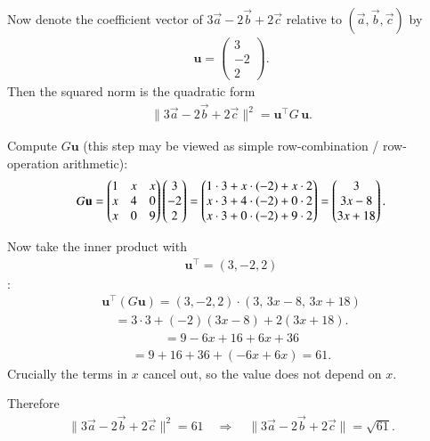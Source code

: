 \documentclass[journal]{IEEEtran}
\begin{document}
Now denote the coefficient vector of $3\vec a-2\vec b+2\vec c$ relative to $(\vec a,\vec b,\vec c)$ by
\begin{align}
\mathbf{u}=\begin{pmatrix}3\\-2\\2\end{pmatrix}.
\end{align}
Then the squared norm is the quadratic form
\begin{align}
\bigl\lVert 3\vec a-2\vec b+2\vec c\bigr\rVert^2
= \mathbf{u}^\top G\,\mathbf{u}.
\end{align}

Compute $G\mathbf{u}$ (this step may be viewed as simple row-combination / row-operation arithmetic):
\begin{align}
G\mathbf{u}
=\begin{pmatrix}1 & x & x\\
x & 4 & 0\\
x & 0 & 9\end{pmatrix}
\begin{pmatrix}3\\-2\\2 \end{pmatrix}
=
\begin{pmatrix}1\cdot 3 + x\cdot(-2)+x\cdot 2\\
x\cdot 3 + 4\cdot(-2) +0\cdot 2\\
x\cdot 3 +0\cdot(-2)+9\cdot 2\end{pmatrix}
=
\begin{pmatrix}3\\3x-8\\3x+18\end{pmatrix} .
\end{align}

Now take the inner product with 
\begin{align}
\mathbf{u}^\top=(3,-2,2)
\end{align} :
\begin{align}
\mathbf{u}^\top (G\mathbf{u})
= (3,-2,2)\cdot (3,\,3x-8,\,3x+18)
\end{align}
\begin{align}
=3\cdot 3 + (-2)(3x-8) + 2(3x+18).
\end{align}
\begin{align}
=9 -6x +16 +6x +36 
\end{align}
\begin{align}
= 9+16+36 +(-6x+6x)=61.
\end{align}
Crucially the terms in $x$ cancel out, so the value does not depend on $x$.

Therefore
\begin{align}
\bigl\lVert 3\vec a-2\vec b+2\vec c\bigr\rVert^2 = 61
\quad\Longrightarrow\quad
\boxed{\bigl\lVert 3\vec a-2\vec b+2\vec c\bigr\rVert=\sqrt{61}}.
\end{align}
\end{document}
